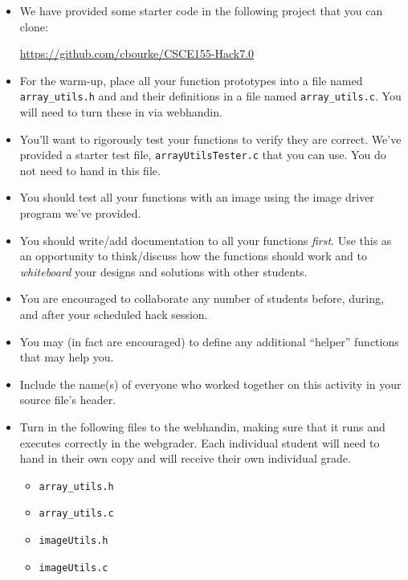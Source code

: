 \documentclass[12pt]{scrartcl}
\begin{document}
\begin{itemize}

  \item We have provided some starter code in the following project that
  you can clone:
  
  \url{https://github.com/cbourke/CSCE155-Hack7.0}

  \item For the warm-up, place all your function prototypes into a file 
  named \texttt{array_utils.h} and and their definitions in a
  file named \texttt{array_utils.c}.  You will need to turn
  these in via webhandin.
  
  \item You'll want to rigorously test your functions to verify they
  are correct.  We've provided a starter test file, 
  \texttt{arrayUtilsTester.c} that you can use.  You 
  do not need to hand in this file.
  
  \item You should test all your functions with an image using the
  image driver program we've provided.
  
  \item You should write/add documentation to all your functions
  \emph{first}. Use this as an opportunity to think/discuss how the 
  functions should work and
  to \emph{whiteboard} your designs and solutions with other students.
  
  \item You are encouraged to collaborate any number of students 
  before, during, and after your scheduled hack session.  

  \item You may (in fact are encouraged) to define any additional
  ``helper'' functions that may help you.

  \item Include the name(s) of everyone who worked together on
  this activity in your source file's header.

  \item Turn in the following files to the webhandin, making sure that 
  it runs and executes correctly in the webgrader.  Each individual 
  student will need to hand in their own copy and will receive 
  their own individual grade.
  \begin{itemize}
    \item \texttt{array_utils.h} 
    \item \texttt{array_utils.c} 
    \item \texttt{imageUtils.h} 
    \item \texttt{imageUtils.c}
  \end{itemize}

\end{itemize}  
\end{document}
